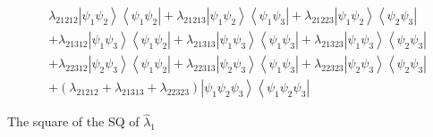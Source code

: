 \documentclass[aps,preprint]{revtex4}%
\begin{document}
\begin{align}
& \lambda_{21212}\left\vert \psi_{1}\psi_{2}\right\rangle \left\langle
\psi_{1}\psi_{2}\right\vert +\lambda_{21213}\left\vert \psi_{1}\psi
_{2}\right\rangle \left\langle \psi_{1}\psi_{3}\right\vert +\lambda
_{21223}\left\vert \psi_{1}\psi_{2}\right\rangle \left\langle \psi_{2}\psi
_{3}\right\vert \nonumber\\
& +\lambda_{21312}\left\vert \psi_{1}\psi_{3}\right\rangle \left\langle
\psi_{1}\psi_{2}\right\vert +\lambda_{21313}\left\vert \psi_{1}\psi
_{3}\right\rangle \left\langle \psi_{1}\psi_{3}\right\vert +\lambda
_{21323}\left\vert \psi_{1}\psi_{3}\right\rangle \left\langle \psi_{2}\psi
_{3}\right\vert \nonumber\\
& +\lambda_{22312}\left\vert \psi_{2}\psi_{3}\right\rangle \left\langle
\psi_{1}\psi_{2}\right\vert +\lambda_{22313}\left\vert \psi_{2}\psi
_{3}\right\rangle \left\langle \psi_{1}\psi_{3}\right\vert +\lambda
_{22323}\left\vert \psi_{2}\psi_{3}\right\rangle \left\langle \psi_{2}\psi
_{3}\right\vert \nonumber\\
& +\left(  \lambda_{21212}+\lambda_{21313}+\lambda_{22323}\right)  \left\vert
\psi_{1}\psi_{2}\psi_{3}\right\rangle \left\langle \psi_{1}\psi_{2}\psi
_{3}\right\vert
\end{align}


\bigskip The square of the SQ of $\hat{\lambda}_{1}$ %
\end{document}
